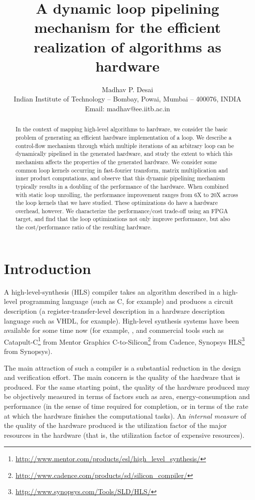 \documentclass[conference]{IEEEtran}
\title{A dynamic loop pipelining mechanism for the efficient realization of algorithms as hardware}
\author{Madhav P. Desai\\
  Indian Institute of Technology -- Bombay, Powai, Mumbai -- 400076, INDIA\\
  Email: madhav@ee.iitb.ac.in }
\begin{document}
\maketitle
\thispagestyle{empty}

\begin{abstract}

  In the context of mapping high-level algorithms to hardware,
  we consider the basic problem of generating an efficient hardware 
  implementation of a loop.  We describe a control-flow mechanism through
  which multiple iterations of an arbitrary loop can be dynamically pipelined in
  the generated hardware,  and study the extent to which this 
  mechanism affects the properties of the generated hardware.
  We consider some common loop kernels occurring in fast-fourier transform,
  matrix multiplication and inner product computations, and
  observe that this dynamic pipelining mechanism typically results in
  a doubling of the performance of the hardware.  When 
  combined with static loop unrolling,  the performance improvement
  ranges from 6X to 20X across the loop kernels that we have studied.
  These optimizations do have a hardware overhead, however.  We characterize
  the performance/cost trade-off using an FPGA target, and find
  that the loop optimizations not only improve performance, but
  also the cost/performance ratio of the resulting hardware.

\end{abstract}

\section{Introduction}

A high-level-synthesis (HLS) compiler takes an algorithm described in
a high-level programming language (such as C, for example) and produces a circuit
description (a register-transfer-level description in a hardware
description language such as VHDL, for example).
High-level synthesis systems have been available for some time
now (for example, \cite{pegasus-cash}, \cite{spark-vlsi-paper} and
commercial tools such as Catapult-C\footnote{\url{http://www.mentor.com/products/esl/high_level_synthesis/}} from Mentor Graphics
C-to-Silicon\footnote{\url{http://www.cadence.com/products/sd/silicon_compiler/}} from Cadence,
Synopsys HLS\footnote{\url{http://www.synopsys.com/Tools/SLD/HLS/}} from Synopsys).

The main attraction of such a compiler is a substantial reduction in 
the design and verification effort.  The
main concern is the quality of the hardware that is produced.
For the same starting point, the quality of the hardware produced may be objectively
measured in terms of factors such as area, energy-consumption and performance (in the
sense of time required for completion, or in terms of the rate at which the hardware
finishes the computational tasks).  An {\em internal measure} of the quality of the
hardware produced is the utilization factor of the major resources in the hardware (that is,
the utilization factor of expensive resources).  
\end{document}
